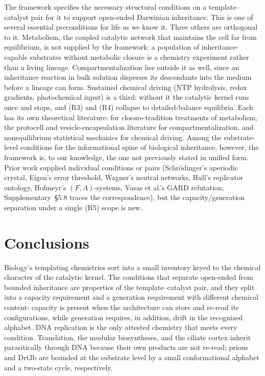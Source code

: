 \documentclass[aps,prx,reprint,amsmath,amssymb,floatfix,superscriptaddress,nofootinbib]{revtex4-2}
\theoremstyle{plain-thm}
\theoremstyle{definition-thm}
\begin{document}
The framework specifies the necessary structural conditions on a template--catalyst pair for it to support open-ended Darwinian inheritance. This is one of several essential preconditions for life as we know it. Three others are orthogonal to it. Metabolism, the coupled catalytic network that maintains the cell far from equilibrium, is not supplied by the framework: a population of inheritance-capable substrates without metabolic closure is a chemistry experiment rather than a living lineage. Compartmentalization lies outside it as well, since an inheritance reaction in bulk solution disperses its descendants into the medium before a lineage can form. Sustained chemical driving (NTP hydrolysis, redox gradients, photochemical input) is a third: without it the catalytic kernel runs once and stops, and (R3) and (R4) collapse to detailed-balance equilibria. Each has its own theoretical literature: \citet{Pross2011, MaturanaVarela1972, Hofmeyr2017} for closure-tradition treatments of metabolism, the protocell and vesicle-encapsulation literature for compartmentalization, and nonequilibrium statistical mechanics for chemical driving. Among the substrate-level conditions for the informational spine of biological inheritance, however, the framework is, to our knowledge, the one not previously stated in unified form. Prior work supplied individual conditions or pairs (Schr\"odinger's aperiodic crystal, Eigen's error threshold, Wagner's neutral networks, Hull's replicator ontology, Hofmeyr's $(F, A)$-systems, Vasas et al.'s GARD refutation; Supplementary~\S5.8 traces the correspondence), but the capacity/generation separation under a single (R5) scope is new.

\section{Conclusions}
\label{sec:conclusions}

Biology's templating chemistries sort into a small inventory keyed to the chemical character of the catalytic kernel. The conditions that separate open-ended from bounded inheritance are properties of the template--catalyst pair, and they split into a capacity requirement and a generation requirement with different chemical content: capacity is present when the architecture can store and re-read its configurations, while generation requires, in addition, drift in the recognized alphabet. DNA replication is the only attested chemistry that meets every condition. Translation, the modular biosyntheses, and the ciliate cortex inherit parasitically through DNA because their own products are not re-read; prions and Drt3b are bounded at the substrate level by a small conformational alphabet and a two-state cycle, respectively.
\end{document}
